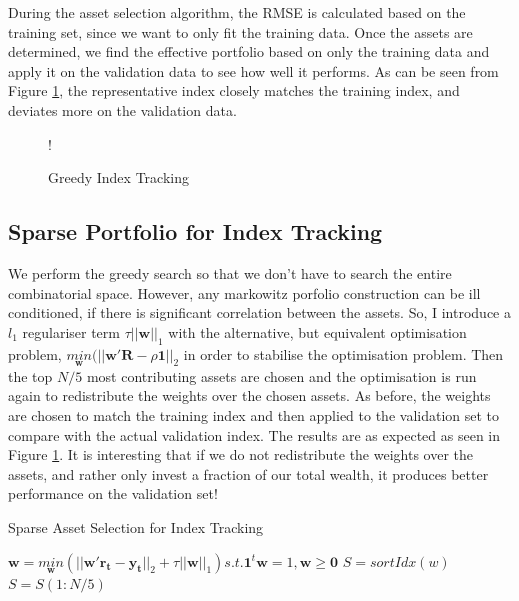 \documentclass[11pt]{article}
\begin{document}
During the asset selection algorithm, the RMSE is calculated based on the training set, since we want to only fit the
training data. Once the assets are determined, we find the effective portfolio based on only the training data and 
apply it on the validation data to see how well it performs. As can be seen from Figure \ref{fig:q2-all-based-on-first},
the representative index closely matches the training index, and deviates more on the validation data.

\begin{figure}[!h]
   \centering 
 	 {!} { }
    \caption{Greedy Index Tracking}
	\label{fig:q2-all-based-on-first}
	\vspace{-0.5cm}
\end{figure}

\subsection{Sparse Portfolio for Index Tracking}

We perform the greedy search so that we don't have to search the entire combinatorial space. However, any markowitz
porfolio construction can be ill conditioned, if there is significant correlation between the assets. So, I introduce
a $l_1$ regulariser term $\tau||\bm{w}||_1$ with the alternative, but equivalent optimisation problem, 
$\underset{\bm{w}}{min}(||\bm{w}'\bm{R} - \rho\bm{1}||_2$ in order to stabilise the optimisation problem. Then the top
$N/5$ most contributing assets are chosen and the optimisation is run again to redistribute the weights over the 
chosen assets. As before, the weights are chosen to match the training index and then applied to the validation set
to compare with the actual validation index. The results are as expected as seen in Figure \ref{fig:q2-all-based-on-first}.
It is interesting that if we do not redistribute the weights over the assets, and rather only invest a fraction of
our total wealth, it produces better performance on the validation set!

\begin{algorithm}[H]
\caption{Sparse Asset Selection for Index Tracking}
\label{alg:sparse-index}
\begin{algorithmic}

\State $\bm{w} = \underset{\bm{w}}{min}(||\bm{w}'\bm{r_t} - \bm{y_t}||_2 + \tau||\bm{w}||_1) s.t. \bm{1}^t\bm{w} = 1, \bm{w} \geq \bm{0}$
\State $S = sortIdx(w)$
\State $S = S(1:N/5)$

\end{algorithmic}
\end{algorithm}
\end{document}
